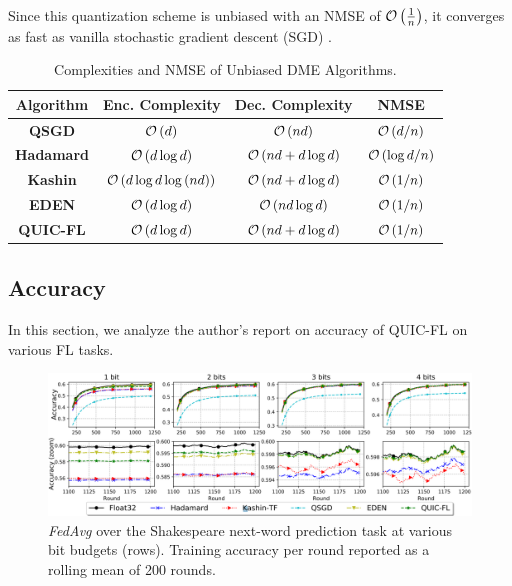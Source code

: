 \documentclass[journal,12pt,twocolumn]{IEEEtran}
\begin{document}
Since this quantization scheme is unbiased with an NMSE of
\(\mathcal O\left(\frac{1}{n}\right)\), it converges as fast as vanilla stochastic gradient
descent (SGD) \cite{kami19}.
\begin{table}
    \centering
    \begin{tabular}{|c|c|c|c|}
        \hline
        \textbf{Algorithm} & \textbf{Enc. Complexity} & \textbf{Dec. Complexity} & \textbf{NMSE} \\
        \hline 
        \textbf{QSGD} & \(\mathcal O\left(d\right)\) & \(\mathcal O\left(nd\right)\) & \(\mathcal O\left(d/n\right)\) \\
        \hline
        \textbf{Hadamard} & \(\mathcal O\left(d\log d\right)\) & \(\mathcal O\left(nd + d\log d\right)\) & \(\mathcal O\left(\log d/n\right)\) \\
        \hline
        \textbf{Kashin} & \(\mathcal O\left(d\log d\log\left(nd\right)\right)\) & \(\mathcal O\left(nd + d\log d\right)\) & \(\mathcal O\left(1/n\right)\) \\
        \hline
        \textbf{EDEN} & \(\mathcal O\left(d\log d\right)\) & \(\mathcal O\left(nd\log d\right)\) & \(\mathcal O\left(1/n\right)\) \\
        \hline
        \textbf{QUIC-FL} & \(\mathcal O\left(d\log d\right)\) & \(\mathcal O\left(nd + d\log d\right)\) & \(\mathcal O\left(1/n\right)\) \\
        \hline
    \end{tabular}
    \caption{Complexities and NMSE of Unbiased DME Algorithms.}
    \label{tab:quic-fl-comp}
\end{table}

\subsection{Accuracy}
\label{ssec:res-acc}
In this section, we analyze the author's report on accuracy of QUIC-FL on
various FL tasks.

\begin{figure}[!ht]
    \centering
    \includegraphics[width=\columnwidth]{images/nextword.png}
    \caption{\emph{FedAvg} over the Shakespeare next-word prediction task at
    various bit budgets (rows). Training accuracy per round reported as a
    rolling mean of 200 rounds. \cite{basat2023quicfl}}
    \label{fig:quic-fl-nextword}
\end{figure}
\end{document}
